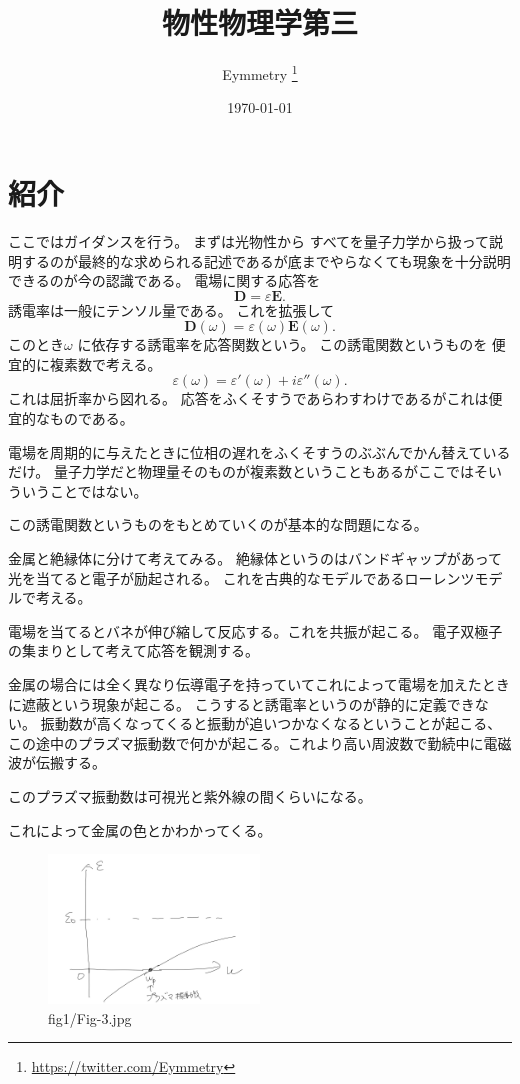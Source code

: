 \documentclass[dvipdfmx]{jsarticle}
\title{物性物理学第三}
\author{Eymmetry \thanks{\url{https://twitter.com/Eymmetry}}}
\date{\today}
\begin{document}
\maketitle
\section{紹介}
ここではガイダンスを行う。
まずは光物性から
すべてを量子力学から扱って説明するのが最終的な求められる記述であるが底までやらなくても現象を十分説明できるのが今の認識である。
電場に関する応答を
\[
\bm{D}=\varepsilon \bm{E}
.\] 
誘電率は一般にテンソル量である。
これを拡張して
\[
\bm{D}(\omega)=\varepsilon(\omega)\bm{E}(\omega)
.\] 
このとき$\omega$ に依存する誘電率を応答関数という。
この誘電関数というものを
便宜的に複素数で考える。
\[
\varepsilon(\omega)=\varepsilon'(\omega)+i\varepsilon''(\omega)
.\] 
これは屈折率から図れる。
応答をふくそすうであらわすわけであるがこれは便宜的なものである。

電場を周期的に与えたときに位相の遅れをふくそすうのぶぶんでかん替えているだけ。
量子力学だと物理量そのものが複素数ということもあるがここではそいういうことではない。

この誘電関数というものをもとめていくのが基本的な問題になる。

金属と絶縁体に分けて考えてみる。
絶縁体というのはバンドギャップがあって光を当てると電子が励起される。
これを古典的なモデルであるローレンツモデルで考える。

電場を当てるとバネが伸び縮して反応する。これを共振が起こる。
電子双極子の集まりとして考えて応答を観測する。

金属の場合には全く異なり伝導電子を持っていてこれによって電場を加えたときに遮蔽という現象が起こる。
こうすると誘電率というのが静的に定義できない。
振動数が高くなってくると振動が追いつかなくなるということが起こる、この途中のプラズマ振動数で何かが起こる。これより高い周波数で勤続中に電磁波が伝搬する。

このプラズマ振動数は可視光と紫外線の間くらいになる。

これによって金属の色とかわかってくる。
\begin{figure}[H]
	\centering
	\includegraphics[width=0.5\textwidth]{fig1/Fig-3.jpg}
	\caption{fig1/Fig-3.jpg}
	\label{fig:fig1-Fig-3-jpg}
\end{figure}
\end{document}
